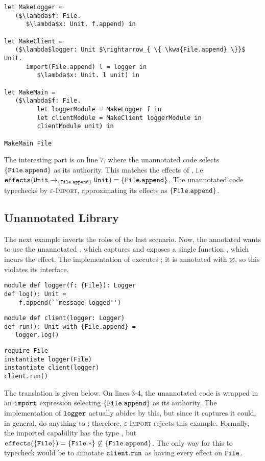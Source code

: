 \begin{lstlisting}
let MakeLogger =
   ($\lambda$f: File.
      $\lambda$x: Unit. f.append) in
          
let MakeClient =
   ($\lambda$logger: Unit $\rightarrow_{ \{ \kwa{File.append} \}}$ Unit.
      import(File.append) l = logger in
         $\lambda$x: Unit. l unit) in
          
let MakeMain =
   ($\lambda$f: File.
         let loggerModule = MakeLogger f in
         let clientModule = MakeClient loggerModule in
         clientModule unit) in

MakeMain File
\end{lstlisting}

The interesting part is on line $7$, where the unannotated code selects $\{ \mathtt{File.append} \}$ as its authority. This matches the effects of , i.e.
 $\mathtt{effects}(\mathtt{Unit} \rightarrow_{\{\mathtt{File.append}\}} \mathtt{Unit}) = \{
 \mathtt{File.append} \}$. The unannotated code typechecks by \textsc{$\varepsilon$-Import}, approximating its effects as $\mathtt{\{ \mathtt{File.append} \}}$.

\subsection{Unannotated Library}

The next example inverts the roles of the last scenario. Now, the annotated 
 wants to use the unannotated , which captures 
 and exposes a single function , which incurs the
  effect. The implementation of  executes
 ; it is annotated with $\varnothing$, so this violates its interface.

\begin{lstlisting}
module def logger(f: {File}): Logger
def log(): Unit =
    f.append(``message logged'')
\end{lstlisting}

\begin{lstlisting}
module def client(logger: Logger)
def run(): Unit with {File.append} =
   logger.log()
\end{lstlisting}

\begin{lstlisting}
require File
instantiate logger(File)
instantiate client(logger)
client.run()
\end{lstlisting}

The translation is given below. On lines 3-4, the unannotated code is wrapped
in an $\mathtt{import}$ expression selecting $\{ \mathtt{File.append} \}$ as its
authority. The implementation of $\mathtt{logger}$ actually abides by this, but
since it captures 
 it could, in general, do anything to ; therefore,
\textsc{$\varepsilon$-Import} rejects this example. Formally, the imported capability
has the type , but $\mathtt{effects}(\{ \mathtt{File} \}) = \{ \mathtt{File}.* \}
\not\subseteq \{ \mathtt{ File.append } \}$.
The only way for this to typecheck would be to annotate $\mathtt{client.run}$ as having every effect on $\mathtt{File}$.

